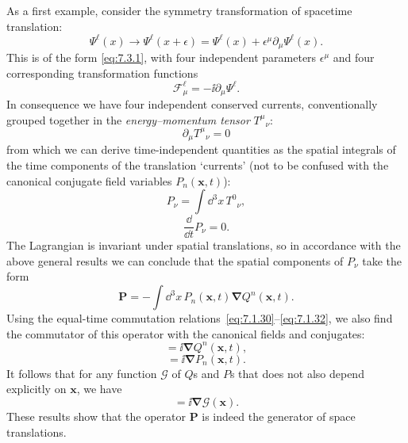 As a first example, consider the symmetry transformation of spacetime
translation:
\begin{equation}
\Psi^\ell(x)\longrightarrow\Psi^\ell(x+\epsilon)
=\Psi^\ell(x)+\epsilon^\mu\partial_\mu\Psi^\ell(x).
\tag{7.3.20}\label{eq:7.3.20}
\end{equation}
This is of the form \eqref{eq:7.3.1}, with four independent parameters $\epsilon^\mu$
and four corresponding transformation functions
\begin{equation}
\mathcal{F}^\ell_\mu=-\ii\partial_\mu\Psi^\ell.
\tag{7.3.21}\label{eq:7.3.21}
\end{equation}
In consequence we have four independent conserved currents, conventionally
grouped together in the \emph{energy--momentum tensor} $T^\mu{}_\nu$:
\begin{equation}
\partial_\mu T^\mu{}_\nu=0
\tag{7.3.22}\label{eq:7.3.22}
\end{equation}
from which we can derive time-independent quantities as the spatial integrals
of the time components of the translation `currents' (not to be confused with
the canonical conjugate field variables $P_n(\mathbf{x},t)$):
\begin{equation}
P_\nu=\int \dd^3x\,T^0{}_\nu,
\tag{7.3.23}\label{eq:7.3.23}
\end{equation}
\begin{equation}
\frac{\dd}{\dd t}P_\nu=0.
\tag{7.3.24}\label{eq:7.3.24}
\end{equation}
The Lagrangian is invariant under spatial translations, so in accordance with
the above general results we can conclude that the spatial components of
$P_\nu$ take the form
\begin{equation}
\mathbf{P}=-\int \dd^3x\,P_n(\mathbf{x},t)\boldsymbol{\nabla}Q^n(\mathbf{x},t).
\tag{7.3.25}\label{eq:7.3.25}
\end{equation}
Using the equal-time commutation relations~\eqref{eq:7.1.30}--\eqref{eq:7.1.32}, we also find the
commutator of this operator with the canonical fields and conjugates:
\begin{equation}
[\mathbf{P},Q^n(\mathbf{x},t)]=\ii\boldsymbol{\nabla}Q^n(\mathbf{x},t),
\tag{7.3.26}\label{eq:7.3.26}
\end{equation}
\begin{equation}
[\mathbf{P},P_n(\mathbf{x},t)]=\ii\boldsymbol{\nabla}P_n(\mathbf{x},t).
\tag{7.3.27}\label{eq:7.3.27}
\end{equation}
It follows that for any function $\mathcal{G}$ of $Q$s and $P$s that does not
also depend explicitly on $\mathbf{x}$, we have
\begin{equation}
[\mathbf{P},\mathcal{G}(\mathbf{x})]=\ii\boldsymbol{\nabla}\mathcal{G}(\mathbf{x}).
\tag{7.3.28}\label{eq:7.3.28}
\end{equation}
These results show that the operator $\mathbf{P}$ is indeed the generator of
space translations.

